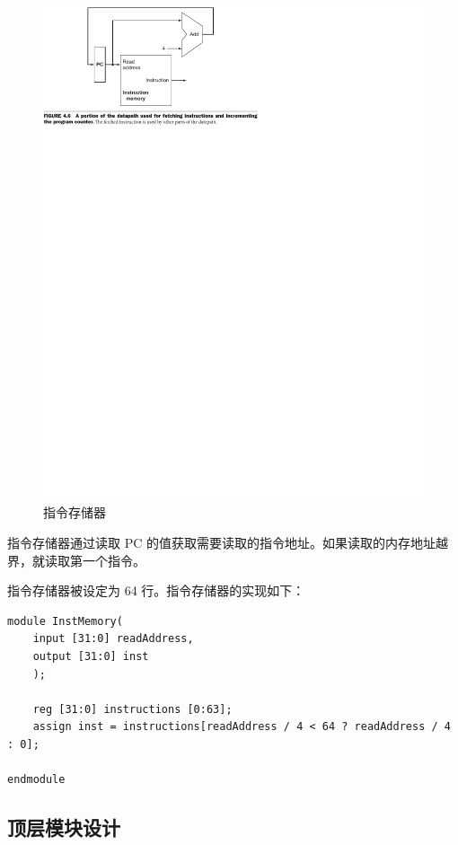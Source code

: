 \documentclass[a4paper,UTF8]{ctexart}
\begin{document}
\begin{figure}[h]
    \centering
    \includegraphics[width=\textwidth]{instruction.pdf}
    \caption{指令存储器}
    \label{fig:instr}
\end{figure}

指令存储器通过读取 PC 的值获取需要读取的指令地址。如果读取的内存地址越界，就读取第一个指令。

指令存储器被设定为 64 行。指令存储器的实现如下：

\begin{lstlisting}[caption=InstMemory.v]
module InstMemory(
    input [31:0] readAddress,
    output [31:0] inst
    );

    reg [31:0] instructions [0:63];
    assign inst = instructions[readAddress / 4 < 64 ? readAddress / 4 : 0];

endmodule
\end{lstlisting}

\subsection{顶层模块设计}
\end{document}
